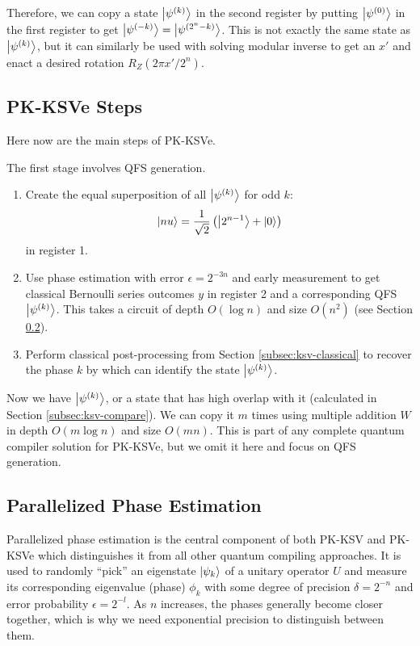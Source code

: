 Therefore, we can copy a state $\left\vert{\psi^{(k)}}\right\rangle$ in the second register by
putting $\left\vert{\psi^{(0)}}\right\rangle$ in the first register to get $\left\vert{\psi^{(-k)}}\right\rangle = \left\vert{\psi^{(2^n - k)}}\right\rangle$.
This is not exactly the same state as $\left\vert{\psi^{(k)}}\right\rangle$, but it can similarly be used
with solving modular inverse to get an $x'$ and enact a desired rotation $R_Z(2\pi x' / 2^n)$.

\subsection{PK-KSVe Steps}
\label{subsec:ksv-steps}

Here now are the main steps of PK-KSVe.

The first stage involves QFS generation.

\begin{enumerate}
\item Create the equal superposition of all $\left\vert{\psi^{(k)}}\right\rangle$ for odd $k$:
\begin{equation}
\left\vert{nu}\right\rangle = \frac{1}{\sqrt{2}} \left( \left\vert{2^{n-1}}\right\rangle + \left\vert{0}\right\rangle \right)
\end{equation}
in register 1.
\item Use phase estimation with error $\epsilon = 2^{-3n}$ and early
measurement to get classical Bernoulli series outcomes $y$ in register 2
and a corresponding QFS $\left\vert{\psi^{(k)}}\right\rangle$. This takes a circuit of
depth $O(\log n)$ and size $O(n^2)$ (see Section \ref{subsec:ppe}).
\item Perform classical post-processing from Section \ref{subsec:ksv-classical} to
recover the phase $k$ by which can identify the state $\left\vert{\psi^{(k)}}\right\rangle$.
\end{enumerate}

Now we have $\left\vert{\psi^{(k)}}\right\rangle$, or a state that has high overlap with it
(calculated in Section \ref{subsec:ksv-compare}).
We can copy it $m$ times using multiple addition $W$ in depth
$O(m \log n)$ and size $O(mn)$. This is part of any complete
quantum compiler solution for PK-KSVe, but we omit it here and
focus on QFS generation.

\subsection{Parallelized Phase Estimation}
\label{subsec:ppe}

Parallelized phase estimation is the central component of both
PK-KSV and PK-KSVe which distinguishes it from all other quantum
compiling approaches. It is used to randomly ``pick'' an
eigenstate $\left\vert{\psi_k}\right\rangle$ of a unitary operator $U$ and
measure its corresponding eigenvalue (phase) $\phi_k$
with some degree of precision $\delta = 2^{-n}$ and
error probability $\epsilon = 2^{-l}$. As $n$ increases, the phases
generally become closer together, which is why we need exponential precision
to distinguish between them.

